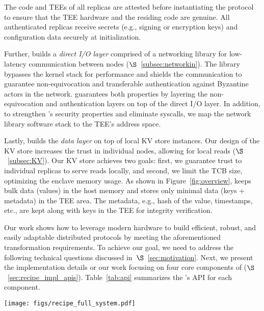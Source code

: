 The code and TEEs of all replicas are attested before instantiating the protocol to ensure that the TEE hardware and the residing code are genuine. All authenticated replicas receive secrets (e.g., signing or encryption keys) and configuration data securely at initialization. 

Further, \projecttitle{} builds a \emph{direct I/O layer} comprised of a networking library for low-latency communication between nodes ($\S$~\ref{subsec:networkin}). The library bypasses the kernel stack for performance and shields the communication to guarantee non-equivocation and transferable authentication against Byzantine actors in the network. \projecttitle{} guarantees both properties by layering the non-equivocation and authentication layers on top of the direct I/O layer. In addition,  to strengthen \projecttitle{}'s security properties and eliminate syscalls, we map the network library software stack to the TEE's address space.

Lastly, \projecttitle{} builds the  \emph{data layer} on top of local KV store instances. Our design of the KV store increases the trust in individual nodes, allowing for local reads ($\S$~\ref{subsec:KV}). Our KV store achieves two goals: first, we guarantee trust to individual replicas to serve reads locally, and second, we limit the TCB size, optimizing the enclave memory usage. As shown in Figure~\ref{fig:overview}, \projecttitle{} keeps bulk data (values) in the host memory and stores only minimal data (keys + metadata) in the TEE area. The metadata, e.g., hash of the value, timestamps, etc., are kept along with keys in the TEE for integrity verification. 



Our work shows how to leverage modern hardware to build efficient, robust, and easily adaptable distributed protocols by meeting the aforementioned transformation requirements.
To achieve our goal, we need to address the following technical questions discussed in~$\S$~\ref{sec:motivation}.
Next, we present the implementation details or our work focusing on four core components of \projecttitle{} ($\S$~\ref{sec:recipe_impl_apis}). Table~\ref{tab:api} summarizes the \projecttitle{}'s API for each component. 

\begin{figure*}[t]
    \begin{center}
        \texttt{[image: figs/recipe\_full\_system.pdf]}
        \caption{\projecttitle{}'s system architecture.}
        \label{fig:overview}
    \end{center}
\end{figure*}


